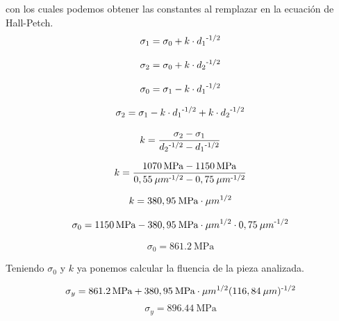\documentclass[12pt,a4paper]{article}
\begin{document}
con los cuales podemos obtener las constantes al remplazar en la ecuación de Hall-Petch.
\begin{equation}
    \sigma_1 = \sigma_0 +k\cdot d_1 \textsuperscript{-1/2}
\end{equation}

\begin{equation}
    \sigma_2 = \sigma_0 +k\cdot d_2 \textsuperscript{-1/2}
\end{equation}

\begin{equation}
    \sigma_0 = \sigma_1 -k\cdot d_1 \textsuperscript{-1/2}
\end{equation}

\begin{equation}
    \sigma_2 = \sigma_1 -k\cdot d_1 \textsuperscript{-1/2} +k\cdot d_2 \textsuperscript{-1/2}
\end{equation}

\begin{equation}
    k = \frac{\sigma_2 - \sigma_1}{d_2 \textsuperscript{-1/2} - d_1 \textsuperscript{-1/2}}
\end{equation}

\begin{equation}
    k = \frac{\SI{1 070}{\mega\pascal} - \SI{1 150}{\mega\pascal}}{{0,55\: \mu m\textsuperscript{-1/2}} - 0,75\: \mu m\textsuperscript{-1/2}}
\end{equation}

\begin{equation}
    k = 380,95\: \text{MPa}\cdot \mu m\textsuperscript{1/2}
\end{equation}

\begin{equation}
    \sigma_0 = \SI{1 150}{\mega\pascal} - 380,95\: \text{MPa}\cdot \mu m\textsuperscript{1/2} \cdot 0,75\: \mu m\textsuperscript{-1/2}
\end{equation}

\begin{equation}
    \sigma_0 = \SI{861,2}{\mega\pascal} 
\end{equation}

Teniendo $\sigma_0$ y $k$ ya ponemos calcular la fluencia de la pieza analizada.

\begin{equation}
    \sigma_y = \SI{861,2}{\mega\pascal} + 380,95\: \text{MPa}\cdot \mu m\textsuperscript{1/2} (116,84\: \mu m)\textsuperscript{-1/2}
\end{equation}
\begin{equation}
    \sigma_y = \SI{896,44}{\mega\pascal} 
\end{equation}
\end{document}
